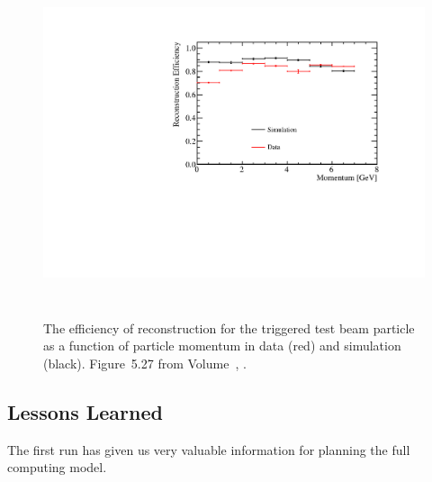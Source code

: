 \begin{figure}[htp]
\centering
\includegraphics[height=4in]{graphics/BeamParticleEfficiencyVsMomentum.pdf}
\caption[Efficiency of reconstruction for the triggered test beam particle]{The efficiency of reconstruction for the triggered test beam particle as a function of particle
momentum in data (red) and simulation (black). Figure~5.27 from Volume~\volnumberphysics{}, \voltitlephysics{}.}
\label{fig:ch-exec-comp-tracking}
\end{figure}





\subsection{Lessons Learned}
The first  run has given us very valuable information for planning the full  computing model. 


